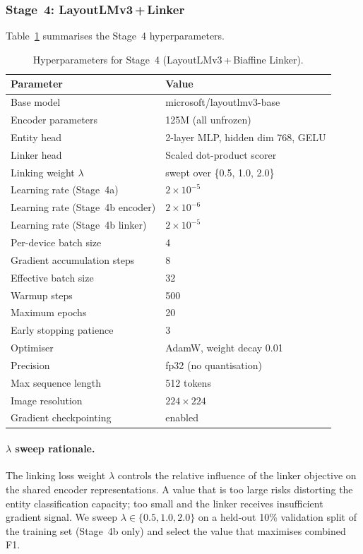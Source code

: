\subsubsection{Stage~4: LayoutLMv3\,+\,Linker}
\label{sec:stage4-hyperparams}

Table~\ref{tab:stage4-hyperparams} summarises the Stage~4 hyperparameters.

\begin{table}[h]
  \centering
  \caption{Hyperparameters for Stage~4 (LayoutLMv3\,+\,Biaffine Linker).}
  \label{tab:stage4-hyperparams}
  \begin{tabular}{ll}
    \hline
    \textbf{Parameter} & \textbf{Value} \\
    \hline
    Base model & microsoft/layoutlmv3-base \\
    Encoder parameters & 125M (all unfrozen) \\
    Entity head & 2-layer MLP, hidden dim 768, GELU \\
    Linker head & Scaled dot-product scorer \\
    Linking weight $\lambda$ & swept over \{0.5, 1.0, 2.0\} \\
    Learning rate (Stage~4a) & $2 \times 10^{-5}$ \\
    Learning rate (Stage~4b encoder) & $2 \times 10^{-6}$ \\
    Learning rate (Stage~4b linker) & $2 \times 10^{-5}$ \\
    Per-device batch size & 4 \\
    Gradient accumulation steps & 8 \\
    Effective batch size & 32 \\
    Warmup steps & 500 \\
    Maximum epochs & 20 \\
    Early stopping patience & 3 \\
    Optimiser & AdamW, weight decay 0.01 \\
    Precision & fp32 (no quantisation) \\
    Max sequence length & 512 tokens \\
    Image resolution & $224 \times 224$ \\
    Gradient checkpointing & enabled \\
    \hline
  \end{tabular}
\end{table}

\paragraph{$\lambda$ sweep rationale.}
The linking loss weight $\lambda$ controls the relative influence of the
linker objective on the shared encoder representations. A value that is too
large risks distorting the entity classification capacity; too small and the
linker receives insufficient gradient signal. We sweep $\lambda \in
\{0.5, 1.0, 2.0\}$ on a held-out 10\% validation split of the training set
(Stage~4b only) and select the value that maximises combined F1.

